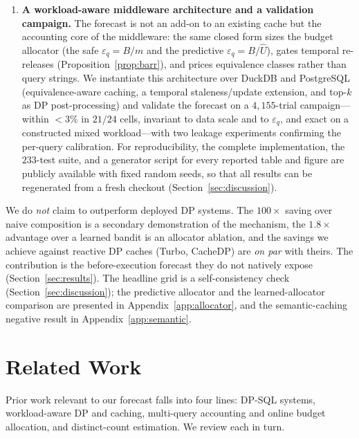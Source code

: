\documentclass[sigconf,nonacm]{acmart}
\newcommand{\eps}{\varepsilon}
\begin{document}
\begin{enumerate}
 \item \textbf{A workload-aware middleware architecture and a validation campaign.} The forecast is not an add-on to an existing cache but the accounting core of the middleware: the same closed form sizes the budget allocator (the safe $\eps_q{=}B/m$ and the predictive $\eps_q{=}B/\hat U$), gates temporal re-releases (Proposition~\ref{prop:barr}), and prices equivalence classes rather than query strings. We instantiate this architecture over DuckDB and PostgreSQL (equivalence-aware caching, a temporal staleness/update extension, and top-$k$ as DP post-processing) and validate the forecast on a $4{,}155$-trial campaign---within $<3\%$ in $21/24$ cells, invariant to data scale and to $\eps_q$, and exact on a constructed mixed workload---with two leakage experiments confirming the per-query calibration. For reproducibility, the complete implementation, the $233$-test suite, and a generator script for every reported table and figure are publicly available with fixed random seeds, so that all results can be regenerated from a fresh checkout (Section~\ref{sec:discussion}).
\end{enumerate}
We do \emph{not} claim to outperform deployed DP systems. The $100\times$ saving over naive composition is a secondary demonstration of the mechanism, the $1.8\times$ advantage over a learned bandit is an allocator ablation, and the savings we achieve against reactive DP caches (Turbo, CacheDP) are \emph{on par} with theirs. The contribution is the before-execution forecast they do not natively expose (Section~\ref{sec:results}). The headline grid is a self-consistency check (Section~\ref{sec:discussion}); the predictive allocator and the learned-allocator comparison are presented in Appendix~\ref{app:allocator}, and the semantic-caching negative result in Appendix~\ref{app:semantic}.

\section{Related Work}
\label{sec:related}

Prior work relevant to our forecast falls into four lines: DP-SQL systems, workload-aware DP and caching, multi-query accounting and online budget allocation, and distinct-count estimation. We review each in turn.
\end{document}

